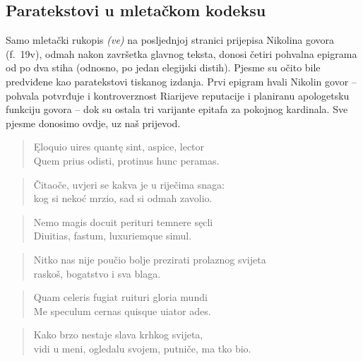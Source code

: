 \documentclass[a5paper,twoside]{article}
\begin{document}
\subsection{Paratekstovi u mletačkom kodeksu}

Samo mletački rukopis \textit{(ve)} na posljednjoj stranici prijepisa Nikolina govora (f.~19v), odmah nakon završetka glavnog teksta, donosi četiri pohvalna epigrama od po dva stiha (odnosno, po jedan elegijski distih). Pjesme su očito bile predviđene kao paratekstovi tiskanog izdanja. Prvi epigram hvali Nikolin govor – pohvala potvrđuje i kontroverznost Riarijeve reputacije i planiranu apologetsku funkciju govora – dok su ostala tri varijante epitafa za pokojnog kardinala. Sve pjesme donosimo ovdje, uz naš prijevod.

\begin{verse}
\begin{altverse}
Ęloquio uires quantę sint, aspice, lector\\
Quem prius odisti, protinus hunc peramas.
\end{altverse}
\end{verse}

\begin{verse}
\begin{altverse}
Čitaoče, uvjeri se kakva je u riječima snaga:\\
kog si nekoć mrzio, sad si odmah zavolio.
\end{altverse}
\end{verse}
\bigskip


\begin{verse}
\begin{altverse}
Nemo magis docuit perituri temnere sęcli\\
Diuitias, fastum, luxuriemque simul.
\end{altverse}
\end{verse}
\begin{verse}
\begin{altverse}
Nitko nas nije poučio bolje prezirati prolaznog svijeta\\
raskoš, bogatstvo i sva blaga.
\end{altverse}
\end{verse}
\bigskip

\begin{verse}
\begin{altverse}
Quam celeris fugiat ruituri gloria mundi\\
Me speculum cernas quisque uiator ades.
\end{altverse}
\end{verse}
\begin{verse}
\begin{altverse}
Kako brzo nestaje slava krhkog svijeta,\\
vidi u meni, ogledalu svojem, putniče, ma tko bio.
\end{altverse}
\end{verse}
\bigskip
\end{document}

